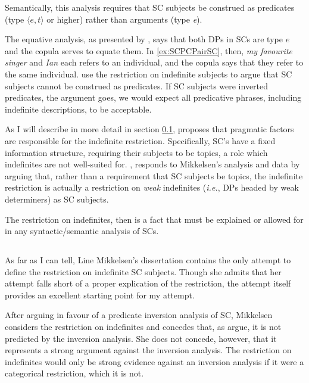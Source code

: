 \documentclass[GPFinal]{subfiles}
\begin{document}
Semantically, this analysis requires that SC subjects be construed as predicates (type $\langle e,t\rangle$ or higher) rather than arguments (type \textit{e}).

The equative analysis, as presented by \textcite{heycockkroch1999pseudocleft}, says that both DPs in SCs are type $e$ and the copula serves to equate them.
In \ref{ex:SCPCPairSC}, then, \textit{my favourite singer} and \textit{Ian} each refers to an individual, and the copula says that they refer to the same individual.
\textcite{heycockkroch1999pseudocleft} use the restriction on indefinite subjects to argue that SC subjects cannot be construed as predicates.
If SC subjects were inverted predicates, the argument goes, we would expect all predicative phrases, including indefinite descriptions, to be acceptable.

As I will describe in more detail in section \ref{sec:Mikkelsen}, \textcite{mikkelsen2004specifying} proposes that pragmatic factors are responsible for the indefinite restriction.
Specifically, SC's have a fixed information structure, requiring their subjects to be topics, a role which indefinites are not well-suited for.
\textcite{heycock2012specification}, responds to Mikkelsen's analysis and data  by arguing that, rather than a requirement that SC subjects be topics, the indefinite restriction is actually a restriction on \textit{weak} indefinites (\textit{i.e.}, DPs headed by weak determiners) as SC subjects.

The restriction on indefinites, then is a fact that must be explained or allowed for in any syntactic/semantic analysis of SCs.

\subsection{\textcite{mikkelsen2004specifying}}\label{sec:Mikkelsen}
As far as I can tell, Line Mikkelsen's dissertation contains the only attempt to define the restriction on indefinite SC subjects.
Though she admits that her attempt falls short of a proper explication of the restriction, the attempt itself provides an excellent starting point for my attempt.

After arguing in favour of a predicate inversion analysis of SC, Mikkelsen considers the restriction on indefinites and concedes that, as \textcite{heycockkroch1999pseudocleft} argue, it is not predicted by the inversion analysis.
She does not concede, however, that it represents a strong argument against the inversion analysis.
The restriction on indefinites would only be strong evidence against an inversion analysis if it were a categorical restriction, which it is not.
\end{document}
